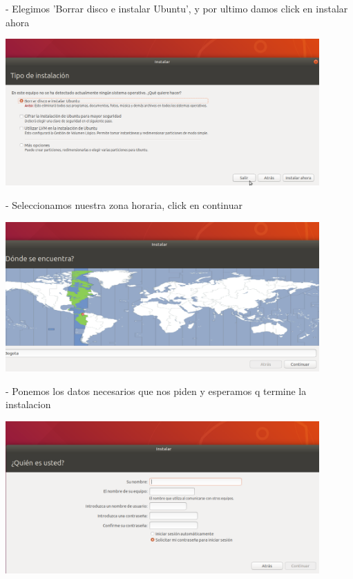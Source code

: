 \documentclass[12pt,letterpaper]{article}
\begin{document}
\begin{itemize}
- Elegimos 'Borrar disco e instalar Ubuntu', y por ultimo damos click en instalar ahora\\
\end{itemize}

\begin{center}
	\includegraphics[width=12cm]{./Imagenes/19} 
\end{center}


\begin{itemize}
- Seleccionamos nuestra zona horaria, click en continuar\\
\end{itemize}

\begin{center}
	\includegraphics[width=12cm]{./Imagenes/20} 
\end{center}



\begin{itemize}
- Ponemos los datos necesarios que nos piden y esperamos q termine la instalacion\\
\end{itemize}

\begin{center}
	\includegraphics[width=12cm]{./Imagenes/21} 
\end{center}
\end{document}
